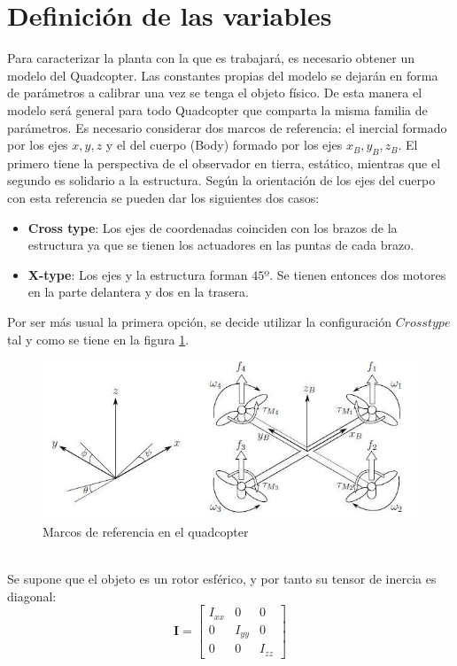 \documentclass[twoside,11pt]{book}
\begin{document}
\section{Definición de las variables}
Para caracterizar la planta con la que es trabajará, es necesario obtener un modelo del Quadcopter. Las constantes propias del modelo se dejarán en forma de parámetros a calibrar una vez se tenga el objeto físico. De esta manera el modelo será general para todo Quadcopter que comparta la misma familia de parámetros.
Es necesario considerar dos marcos de referencia: el inercial formado por los ejes $x,y,z$ y el del cuerpo (Body) formado por los ejes $x_B,y_B,z_B$. El primero tiene la perspectiva de el observador en tierra, estático, mientras que el segundo es solidario a la estructura. Según la orientación de los ejes del cuerpo con esta referencia se pueden dar los siguientes dos casos:
\begin{itemize}
\item \textbf{Cross type}: Los ejes de coordenadas coinciden con los brazos de la estructura ya que se tienen los actuadores en las puntas de cada brazo.
\item \textbf{X-type}: Los ejes y la estructura forman $45º$. Se tienen entonces dos motores en la parte delantera y dos en la trasera.
\end{itemize} 
Por ser más usual la primera opción, se decide utilizar la configuración $Cross type$ tal y como se tiene en la figura \ref{RefQuad}.
\begin{figure}[h!]
\centering
\hspace{2cm}\includegraphics[scale=0.5,bb=0 0 618 261]{images/quad.png}
\caption{Marcos de referencia en el quadcopter}
\label{RefQuad}
\end{figure}\\
Se supone que el objeto es un rotor esférico, y por tanto su tensor de inercia es diagonal:
\begin{equation}\textbf{I}=\left[ \begin{array}{ccc}
I_{xx} & 0 & 0 \\
0 & I_{yy} & 0 \\
0 & 0 & I_{zz} 
\end{array} \right] \end{equation}
\end{document}
